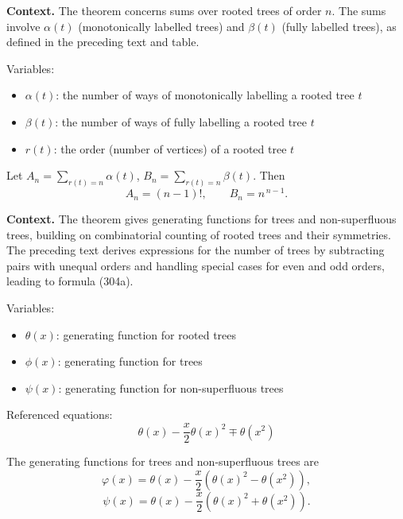 \noindent\textbf{Context.}
The theorem concerns sums over rooted trees of order $n$. The sums involve $\alpha(t)$ (monotonically labelled trees) and $\beta(t)$ (fully labelled trees), as defined in the preceding text and table.

Variables:
\begin{itemize}
    \item $\alpha(t)$: the number of ways of monotonically labelling a rooted tree $t$
    \item $\beta(t)$: the number of ways of fully labelling a rooted tree $t$
    \item $r(t)$: the order (number of vertices) of a rooted tree $t$
\end{itemize}

\begin{theorem}

  \label{thm:302C}
  \uses{}
Let $A_n = \sum_{r(t)=n} \alpha(t)$, $B_n = \sum_{r(t)=n} \beta(t)$. Then
\[
A_n = (n - 1)!,\qquad B_n = n^{\,n-1}.
\]
\end{theorem}

\noindent\textbf{Context.}
The theorem gives generating functions for trees and non-superfluous trees, building on combinatorial counting of rooted trees and their symmetries. The preceding text derives expressions for the number of trees by subtracting pairs with unequal orders and handling special cases for even and odd orders, leading to formula (304a).

Variables:
\begin{itemize}
    \item $\theta(x)$: generating function for rooted trees
    \item $\phi(x)$: generating function for trees
    \item $\psi(x)$: generating function for non-superfluous trees
\end{itemize}

Referenced equations:
\begin{equation}
    \theta(x) - \frac{x}{2} \theta(x)^{2} \mp \theta(x^{2})
    \tag{304a}
\end{equation}

\begin{theorem}

  \label{thm:304A}
The generating functions for trees and non-superfluous trees are
\[
\varphi(x) = \theta(x) - \frac{x}{2} \left( \theta(x)^2 - \theta(x^2) \right), \tag{304b}
\]
\[
\psi(x) = \theta(x) - \frac{x}{2} \left( \theta(x)^2 + \theta(x^2) \right). \tag{304c}
\]
\end{theorem}

